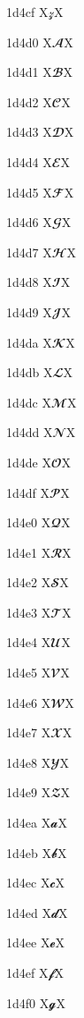 \documentclass[11pt]{article}
\begin{document}
1d4cf X{\ensuremath{\mathscr{z}}}X

1d4d0 X{\ensuremath{\mathbfscr{A}}}X

1d4d1 X{\ensuremath{\mathbfscr{B}}}X

1d4d2 X{\ensuremath{\mathbfscr{C}}}X

1d4d3 X{\ensuremath{\mathbfscr{D}}}X

1d4d4 X{\ensuremath{\mathbfscr{E}}}X

1d4d5 X{\ensuremath{\mathbfscr{F}}}X

1d4d6 X{\ensuremath{\mathbfscr{G}}}X

1d4d7 X{\ensuremath{\mathbfscr{H}}}X

1d4d8 X{\ensuremath{\mathbfscr{I}}}X

1d4d9 X{\ensuremath{\mathbfscr{J}}}X

1d4da X{\ensuremath{\mathbfscr{K}}}X

1d4db X{\ensuremath{\mathbfscr{L}}}X

1d4dc X{\ensuremath{\mathbfscr{M}}}X

1d4dd X{\ensuremath{\mathbfscr{N}}}X

1d4de X{\ensuremath{\mathbfscr{O}}}X

1d4df X{\ensuremath{\mathbfscr{P}}}X

1d4e0 X{\ensuremath{\mathbfscr{Q}}}X

1d4e1 X{\ensuremath{\mathbfscr{R}}}X

1d4e2 X{\ensuremath{\mathbfscr{S}}}X

1d4e3 X{\ensuremath{\mathbfscr{T}}}X

1d4e4 X{\ensuremath{\mathbfscr{U}}}X

1d4e5 X{\ensuremath{\mathbfscr{V}}}X

1d4e6 X{\ensuremath{\mathbfscr{W}}}X

1d4e7 X{\ensuremath{\mathbfscr{X}}}X

1d4e8 X{\ensuremath{\mathbfscr{Y}}}X

1d4e9 X{\ensuremath{\mathbfscr{Z}}}X

1d4ea X{\ensuremath{\mathbfscr{a}}}X

1d4eb X{\ensuremath{\mathbfscr{b}}}X

1d4ec X{\ensuremath{\mathbfscr{c}}}X

1d4ed X{\ensuremath{\mathbfscr{d}}}X

1d4ee X{\ensuremath{\mathbfscr{e}}}X

1d4ef X{\ensuremath{\mathbfscr{f}}}X

1d4f0 X{\ensuremath{\mathbfscr{g}}}X
\end{document}
